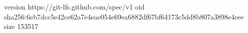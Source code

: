 version https://git-lfs.github.com/spec/v1
oid sha256:6eb7dcc5e42ce62a7e4eae054e69ea6882df67bf64173c5dd8b807a3898e4eee
size 153517
